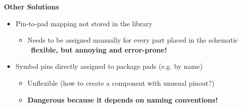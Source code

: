 \begin{frame}{\secname}
  \textbf{Other Solutions}
  \begin{itemize}
    \item Pin-to-pad mapping not stored in the library
      \begin{itemize}
        \item Needs to be assigned manually for every part placed in the schematic
              \faArrowRight\ \textbf{flexible, but annoying and error-prone!}
      \end{itemize}
    \pause
    \item Symbol pins directly assigned to package pads (e.g. by name)
      \begin{itemize}
        \item Unflexible (how to create a component with unusual pinout?)
        \item \textbf{Dangerous because it depends on naming conventions!}
      \end{itemize}
  \end{itemize}
\end{frame}
